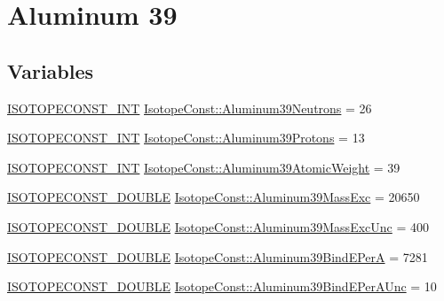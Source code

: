 \hypertarget{group___isotope_const-_aluminum-_al39}{}\section{Aluminum 39}
\label{group___isotope_const-_aluminum-_al39}
\subsection*{Variables}
\begin{DoxyCompactItemize}
\item 
\mbox{\hyperlink{group___isotope_const-_macros_ga5f18360b3e99483a35c32d789e62621c}{I\+S\+O\+T\+O\+P\+E\+C\+O\+N\+S\+T\+\_\+\+I\+NT}} \mbox{\hyperlink{group___isotope_const-_aluminum-_al39_ga8f0a9e88d92a0e89e955e4285f1df85c}{Isotope\+Const\+::\+Aluminum39\+Neutrons}} = 26
\item 
\mbox{\hyperlink{group___isotope_const-_macros_ga5f18360b3e99483a35c32d789e62621c}{I\+S\+O\+T\+O\+P\+E\+C\+O\+N\+S\+T\+\_\+\+I\+NT}} \mbox{\hyperlink{group___isotope_const-_aluminum-_al39_ga64c68f947c66688171d6fb1320473848}{Isotope\+Const\+::\+Aluminum39\+Protons}} = 13
\item 
\mbox{\hyperlink{group___isotope_const-_macros_ga5f18360b3e99483a35c32d789e62621c}{I\+S\+O\+T\+O\+P\+E\+C\+O\+N\+S\+T\+\_\+\+I\+NT}} \mbox{\hyperlink{group___isotope_const-_aluminum-_al39_ga518368ffeaf33992b32890224df1f5fa}{Isotope\+Const\+::\+Aluminum39\+Atomic\+Weight}} = 39
\item 
\mbox{\hyperlink{group___isotope_const-_macros_ga8f45a7272ce02c0b4c65c44636ed719a}{I\+S\+O\+T\+O\+P\+E\+C\+O\+N\+S\+T\+\_\+\+D\+O\+U\+B\+LE}} \mbox{\hyperlink{group___isotope_const-_aluminum-_al39_ga91a05dbc7d305c245fec944e32dd42a6}{Isotope\+Const\+::\+Aluminum39\+Mass\+Exc}} = 20650
\item 
\mbox{\hyperlink{group___isotope_const-_macros_ga8f45a7272ce02c0b4c65c44636ed719a}{I\+S\+O\+T\+O\+P\+E\+C\+O\+N\+S\+T\+\_\+\+D\+O\+U\+B\+LE}} \mbox{\hyperlink{group___isotope_const-_aluminum-_al39_ga4abdda492be05b5c6a4886a1d2802ef9}{Isotope\+Const\+::\+Aluminum39\+Mass\+Exc\+Unc}} = 400
\item 
\mbox{\hyperlink{group___isotope_const-_macros_ga8f45a7272ce02c0b4c65c44636ed719a}{I\+S\+O\+T\+O\+P\+E\+C\+O\+N\+S\+T\+\_\+\+D\+O\+U\+B\+LE}} \mbox{\hyperlink{group___isotope_const-_aluminum-_al39_ga1eeefaf63017a75e53fb1ec7fa1178a1}{Isotope\+Const\+::\+Aluminum39\+Bind\+E\+PerA}} = 7281
\item 
\mbox{\hyperlink{group___isotope_const-_macros_ga8f45a7272ce02c0b4c65c44636ed719a}{I\+S\+O\+T\+O\+P\+E\+C\+O\+N\+S\+T\+\_\+\+D\+O\+U\+B\+LE}} \mbox{\hyperlink{group___isotope_const-_aluminum-_al39_ga0500649b27b2ad25ed06da5a5f39f48d}{Isotope\+Const\+::\+Aluminum39\+Bind\+E\+Per\+A\+Unc}} = 10

\end{DoxyCompactItemize}
